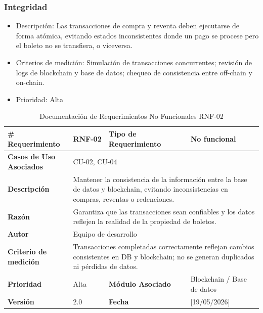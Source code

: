\documentclass[12pt,letterpaper]{article}
\begin{document}
\subsubsection{Integridad}
\begin{itemize}
    \item Descripción: Las transacciones de compra y reventa deben ejecutarse de forma atómica, evitando estados inconsistentes donde un pago se procese pero el boleto no se transfiera, o viceversa.
    \item Criterios de medición: Simulación de transacciones concurrentes; revisión de logs de blockchain y base de datos; chequeo de consistencia entre off-chain y on-chain.
    \item Prioridad: Alta
\end{itemize}
\begin{table}[H]
\centering
\scriptsize
\renewcommand{\arraystretch}{1.2}
\setlength{\tabcolsep}{4pt}

\begin{tabularx}{\textwidth}{|p{3cm}|X|p{3.2cm}|X|}
\hline
\textbf{\# Requerimiento} & RNF-02 & \textbf{Tipo de Requerimiento} & No funcional \\ \hline

\textbf{Casos de Uso Asociados} & \multicolumn{3}{X|}{CU-02, CU-04} \\ \hline

\textbf{Descripción} & 
\multicolumn{3}{p{\dimexpr\textwidth-6cm-12\tabcolsep-4\arrayrulewidth\relax}|}{Mantener la consistencia de la información entre la base de datos y blockchain, evitando inconsistencias en compras, reventas o redenciones.} \\ \hline

\textbf{Razón} & 
\multicolumn{3}{p{\dimexpr\textwidth-6cm-12\tabcolsep-4\arrayrulewidth\relax}|}{Garantiza que las transacciones sean confiables y los datos reflejen la realidad de la propiedad de boletos.} \\ \hline

\textbf{Autor} & \multicolumn{3}{X|}{Equipo de desarrollo} \\ \hline

\textbf{Criterio de medición} & 
\multicolumn{3}{p{\dimexpr\textwidth-6cm-12\tabcolsep-4\arrayrulewidth\relax}|}{Transacciones completadas correctamente reflejan cambios consistentes en DB y blockchain; no se generan duplicados ni pérdidas de datos.} \\ \hline

\textbf{Prioridad} & Alta & \textbf{Módulo Asociado} & Blockchain / Base de datos \\ \hline

\textbf{Versión} & 2.0 & \textbf{Fecha} & [19/05/2026] \\ \hline

\end{tabularx}

\caption{Documentación de Requerimientos No Funcionales RNF-02}
\label{tab:documentacion_rnf02}
\normalsize
\end{table}
\end{document}
